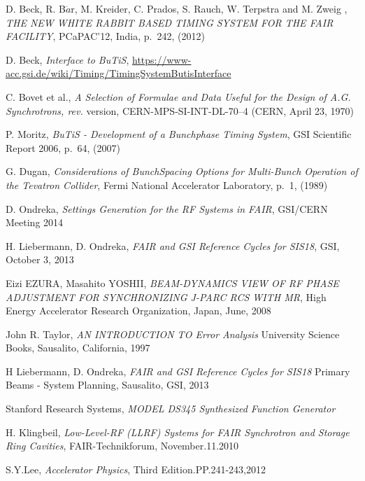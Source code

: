 \begin{thebibliography}{99} 

	D. Beck, R. B$\ddot{a}$r, M. Kreider, C. Prados, S. Rauch, W. Terpstra and M. Zweig ,
	\textit{THE NEW WHITE RABBIT BASED TIMING SYSTEM FOR THE FAIR FACILITY},
	PCaPAC'12, India, p.~242, (2012)

	D. Beck, 
     \textit{Interface to BuTiS},
	\url{https://www-acc.gsi.de/wiki/Timing/TimingSystemButisInterface}

	C. Bovet et al.,
     \textit{A Selection of Formulae and Data Useful for the Design of A.G. Synchrotrons,
rev.}
	version, CERN-MPS-SI-INT-DL-70–4 (CERN, April 23, 1970)

	P. Moritz,
	\textit{BuTiS - Development of a Bunchphase Timing System},
	GSI Scientific Report 2006, p.~64, (2007)

	G. Dugan,
	\textit{Considerations of BunchSpacing Options for Multi-Bunch Operation of the Tevatron Collider},
	Fermi National Accelerator Laboratory, p.~1, (1989)


     D. Ondreka,
	\textit{Settings Generation for the RF Systems in FAIR},
	GSI/CERN Meeting 2014

     H. Liebermann, D. Ondreka,
	\textit{FAIR and GSI Reference Cycles for SIS18},
	GSI, October 3, 2013

     Eizi EZURA, Masahito YOSHII,
	\textit{BEAM-DYNAMICS VIEW OF RF PHASE ADJUSTMENT FOR SYNCHRONIZING J-PARC RCS WITH MR},
	High Energy Accelerator Research Organization, Japan, June, 2008

    John R. Taylor,
    \textit{AN INTRODUCTION TO Error Analysis} 
    University Science Books, Sausalito, California, 1997

    H Liebermann, D. Ondreka,
    \textit{FAIR and GSI Reference Cycles for SIS18} 
    Primary Beams - System Planning, Sausalito, GSI, 2013 

     Stanford Research Systems,
	\textit{MODEL DS345 Synthesized Function Generator}

      H. Klingbeil,
      \textit{Low-Level-RF (LLRF) Systems for FAIR Synchrotron and Storage Ring Cavities},
      FAIR-Technikforum, November.11.2010

      S.Y.Lee,
      \textit{Accelerator 	Physics},
      Third Edition.PP.241-243,2012 
\addtocounter{enumi}{10}



\end{thebibliography}




